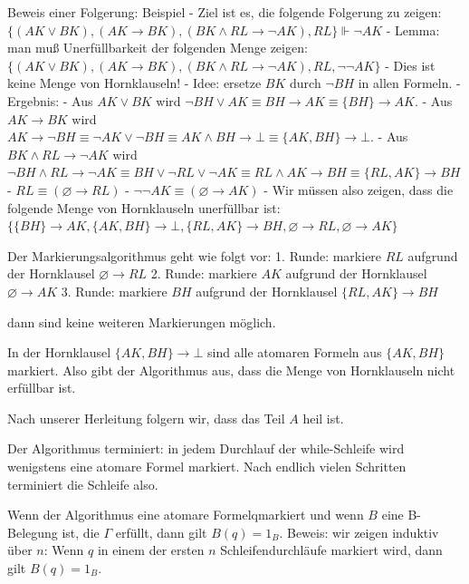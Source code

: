 \documentclass[a4paper]{article}
\begin{document}
\begin{multicols}{3}
  Beweis einer Folgerung: Beispiel - Ziel ist es, die folgende Folgerung
  zu zeigen:
  $\{(AK\vee BK),(AK\rightarrow BK),(BK\wedge RL\rightarrow\lnot AK),RL\}\Vdash\lnot AK$
  - Lemma: man muß Unerfüllbarkeit der folgenden Menge zeigen:
  $\{(AK\vee BK),(AK\rightarrow BK),(BK\wedge RL\rightarrow \lnot AK),RL,\lnot\lnot AK\}$
  - Dies ist keine Menge von Hornklauseln! - Idee: ersetze $BK$ durch
  $\lnot BH$ in allen Formeln. - Ergebnis: - Aus $AK\vee BK$ wird
  $\lnot BH\vee AK\equiv BH\rightarrow AK\equiv\{BH\}\rightarrow AK$. -
  Aus $AK\rightarrow BK$ wird
  $AK\rightarrow\lnot BH\equiv\lnot AK\vee\lnot BH\equiv AK\wedge BH\rightarrow\bot\equiv\{AK,BH\} \rightarrow\bot$.
  - Aus $BK\wedge RL\rightarrow\lnot AK$ wird
  $\lnot BH\wedge RL\rightarrow\lnot AK\equiv BH\vee\lnot RL\vee\lnot AK\equiv RL\wedge AK\rightarrow BH\equiv\{RL,AK\}\rightarrow BH$
  - $RL\equiv (\varnothing\rightarrow RL)$ -
  $\lnot\lnot AK\equiv (\varnothing\rightarrow AK)$ - Wir müssen also
  zeigen, dass die folgende Menge von Hornklauseln unerfüllbar ist:
  $\{\{BH\}\rightarrow AK,\{AK,BH\}\rightarrow\bot,\{RL,AK\}\rightarrow BH,\varnothing\rightarrow RL,\varnothing\rightarrow AK\}$

  Der Markierungsalgorithmus geht wie folgt vor: 1. Runde: markiere $RL$
  aufgrund der Hornklausel $\varnothing\rightarrow RL$ 2. Runde: markiere
  $AK$ aufgrund der Hornklausel $\varnothing\rightarrow AK$ 3. Runde:
  markiere $BH$ aufgrund der Hornklausel $\{RL,AK\}\rightarrow BH$

  dann sind keine weiteren Markierungen möglich.

  In der Hornklausel $\{AK,BH\}\rightarrow\bot$ sind alle atomaren Formeln
  aus $\{AK,BH\}$ markiert. Also gibt der Algorithmus aus, dass die Menge
  von Hornklauseln nicht erfüllbar ist.

  Nach unserer Herleitung folgern wir, dass das Teil $A$ heil ist.

  \begin{enumerate*}
    \itemsep1pt\parskip0pt
    \item
          Der Algorithmus terminiert: in jedem Durchlauf der while-Schleife wird
          wenigstens eine atomare Formel markiert. Nach endlich vielen Schritten
          terminiert die Schleife also.
    \item
          Wenn der Algorithmus eine atomare Formelqmarkiert und wenn $B$ eine
          B-Belegung ist, die $\Gamma$ erfüllt, dann gilt $B(q) = 1_B$. Beweis:
          wir zeigen induktiv über $n$: Wenn $q$ in einem der ersten $n$
          Schleifendurchläufe markiert wird, dann gilt $B(q) = 1_B$.
  \end{enumerate*}


\end{multicols}
\end{document}
